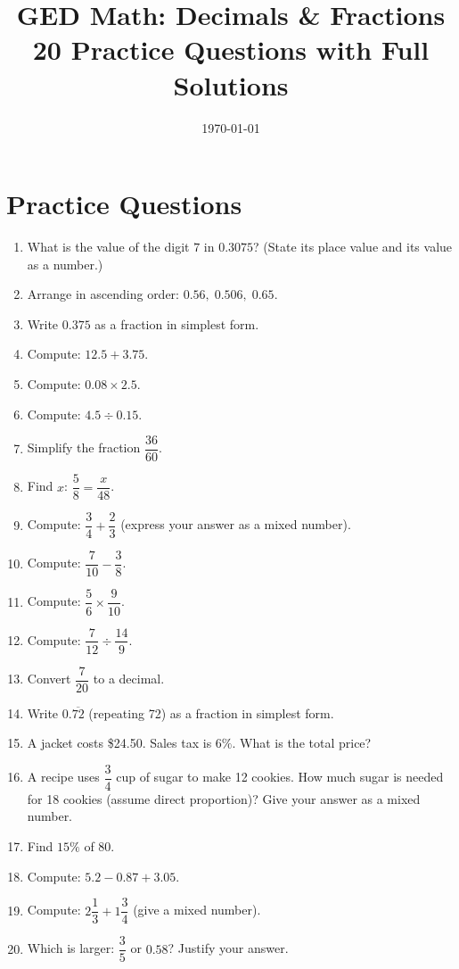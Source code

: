 \documentclass[11pt]{article}
\title{GED Math: Decimals \& Fractions \\ \large 20 Practice Questions with Full Solutions}
\date{\today}
\begin{document}
\maketitle

\section*{Practice Questions}
\begin{enumerate}
  \item What is the value of the digit $7$ in $0.3075$? (State its place value and its value as a number.)
  \item Arrange in ascending order: $0.56,\;0.506,\;0.65$.
  \item Write $0.375$ as a fraction in simplest form.
  \item Compute: $12.5 + 3.75$.
  \item Compute: $0.08 \times 2.5$.
  \item Compute: $4.5 \div 0.15$.
  \item Simplify the fraction $\dfrac{36}{60}$.
  \item Find $x$: $\dfrac{5}{8}=\dfrac{x}{48}$.
  \item Compute: $\dfrac{3}{4}+\dfrac{2}{3}$ (express your answer as a mixed number).
  \item Compute: $\dfrac{7}{10}-\dfrac{3}{8}$.
  \item Compute: $\dfrac{5}{6}\times\dfrac{9}{10}$.
  \item Compute: $\dfrac{7}{12}\div\dfrac{14}{9}$.
  \item Convert $\dfrac{7}{20}$ to a decimal.
  \item Write $0.\overline{72}$ (repeating 72) as a fraction in simplest form.
  \item A jacket costs \$24.50. Sales tax is $6\%$. What is the total price?
  \item A recipe uses $\dfrac{3}{4}$ cup of sugar to make 12 cookies. How much sugar is needed for 18 cookies (assume direct proportion)? Give your answer as a mixed number.
  \item Find $15\%$ of $80$.
  \item Compute: $5.2-0.87+3.05$.
  \item Compute: $2\dfrac{1}{3}+1\dfrac{3}{4}$ (give a mixed number).
  \item Which is larger: $\dfrac{3}{5}$ or $0.58$? Justify your answer.
\end{enumerate}

\newpage
\end{document}
